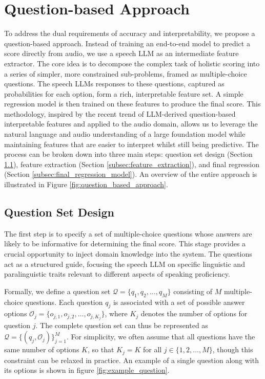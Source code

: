 \documentclass{report}
\begin{document}
\section{Question-based Approach}
\label{sec:question_based_approach}
To address the dual requirements of accuracy and interpretability, we propose a question-based approach. Instead of training an end-to-end model to predict a score directly from audio, we use a speech LLM as an intermediate feature extractor. The core idea is to decompose the complex task of holistic scoring into a series of simpler, more constrained sub-problems, framed as multiple-choice questions. The speech LLMs responses to these questions, captured as probabilities for each option, form a rich, interpretable feature set. A simple regression model is then trained on these features to produce the final score. This methodology, inspired by the recent trend of LLM-derived question-based interpretable features \citep{eltanbouly2025tratestraitspecificrubricassistedcrossprompt,mcinerney2023chillzeroshotcustominterpretable,benara2024craftinginterpretableembeddingsasking, balek2025llmbasedfeaturegenerationtext} and applied to the audio domain, allows us to leverage the natural language and audio understanding of a large foundation model while maintaining features that are easier to interpret whilst still being predictive. The process can be broken down into three main steps: question set design (Section \ref{subsec:question_set_design}), feature extraction (Section \ref{subsec:feature_extraction}), and final regression (Section \ref{subsec:final_regression_model}). An overview of the entire approach is illustrated in Figure \ref{fig:question_based_approach}.

\subsection{Question Set Design}
\label{subsec:question_set_design}
The first step is to specify a set of multiple-choice questions whose answers are likely to be informative for determining the final score. This stage provides a crucial opportunity to inject domain knowledge into the system. The questions act as a structured guide, focusing the speech LLM on specific linguistic and paralinguistic traits relevant to different aspects of speaking proficiency.

Formally, we define a question set $\mathcal{Q} = \{q_1, q_2, \ldots, q_M\}$ consisting of $M$ multiple-choice questions. Each question $q_j$ is associated with a set of possible answer options $\mathcal{O}_j = \{o_{j,1}, o_{j,2}, \ldots, o_{j,K_j}\}$, where $K_j$ denotes the number of options for question $j$. The complete question set can thus be represented as $\mathcal{Q} = \{(q_j, \mathcal{O}_j)\}_{j=1}^M$. For simplicity, we often assume that all questions have the same number of options $K$, so that $K_j = K$ for all $j \in \{1, 2, \ldots, M\}$, though this constraint can be relaxed in practice. An example of a single question along with its options is shown in figure \ref{fig:example_question}.
\end{document}
